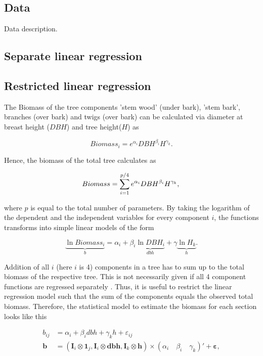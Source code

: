 \documentclass{Vorlage}
\begin{document}
\subsection{Data}

Data description.

\subsection{Separate linear regression}

\subsection{Restricted linear regression}
The Biomass of the tree components 'stem wood' (under bark), 'stem bark', branches (over bark) and twigs (over bark) can be calculated via diameter at breast height ($DBH$) and tree height($H$) as

$$
Biomass_i = e^{\alpha_i}DBH^{\beta_i}H^{\gamma_k}.
$$

Hence, the biomass of the total tree calculates as

$$
Biomass = \sum^{p/4}_{i=1}e^{\alpha_i}DBH^{\beta_i}H^{\gamma_k}, \\
$$



where $p$ is equal to the total number of parameters. By taking the logarithm of the dependent and the independent variables for every component $i$, the functions transforms into simple linear models of the form

$$
\underbrace{\ln Biomass_i}_{b} = \alpha_i + \beta_i \underbrace{\ln DBH_i}_{dbh} + \gamma \underbrace{\ln H_k}_{h}. 
$$


Addition of all $i$ (here $i$ is 4) components in a tree has to sum up to the total biomass of the respective tree. 
This is not necessarily given if all 4 component functions are regressed separately \cite[p. 
6]{parresol_2001}. Thus, it is useful to restrict the linear regression model such that the sum of the components equals the observed total biomass. Therefore, the statistical model to estimate the biomass for each section looks like this

\begin{align*}
b_{ij} &= \alpha_i + \beta_i dbh + \gamma_k h + \varepsilon_{ij} \\
\mathbf{b} &= (\mathbf{I}_i \otimes \mathbf{1}_j, \mathbf{I}_i \otimes \mathbf{dbh}, \mathbf{I}_k \otimes \mathbf{h}) \times (\alpha_i \quad \beta_i \quad \gamma_k)' + \pmb{\varepsilon},  
\end{align*}
\end{document}
